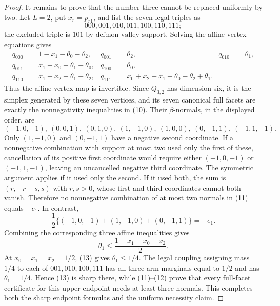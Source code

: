 \documentclass{article}
\begin{document}
\begin{proof}
It remains to prove that the number three cannot be replaced uniformly by two.  Let \(L=2\), put \(x_r=p_{r1}\), and list the seven legal triples as
\[
 000,001,010,011,100,110,111;
\]
the excluded triple is \(101\) by \(\text{def:non-valley-support}\).  Solving the affine vertex equations gives
\[
\begin{aligned}
 q_{000}&=1-x_1-\theta_0-\theta_2,&
 q_{001}&=\theta_2,&
 q_{010}&=\theta_1,\\
 q_{011}&=x_1-x_0-\theta_1+\theta_0,&
 q_{100}&=\theta_0,\\
 q_{110}&=x_1-x_2-\theta_1+\theta_2,&
 q_{111}&=x_0+x_2-x_1-\theta_0-\theta_2+\theta_1.
\end{aligned}                                                                  \tag{10}
\]
Thus the affine vertex map is invertible.  Since \(Q_{3,2}\) has dimension six, it is the simplex generated by these seven vertices, and its seven canonical full facets are exactly the nonnegativity inequalities in (10).  Their \(\beta\)-normals, in the displayed order, are
\[
 (-1,0,-1),\ (0,0,1),\ (0,1,0),\ (1,-1,0),\ (1,0,0),\ (0,-1,1),\ (-1,1,-1). \tag{11}
\]
Only \((1,-1,0)\) and \((0,-1,1)\) have a negative second coordinate.  If a nonnegative combination with support at most two used only the first of these, cancellation of its positive first coordinate would require either \((-1,0,-1)\) or \((-1,1,-1)\), leaving an uncancelled negative third coordinate.  The symmetric argument applies if it used only the second.  If it used both, the sum is \((r,-r-s,s)\) with \(r,s>0\), whose first and third coordinates cannot both vanish.  Therefore no nonnegative combination of at most two normals in (11) equals \(-e_1\).  In contrast,
\[
 \frac12\bigl\{(-1,0,-1)+(1,-1,0)+(0,-1,1)\bigr\}=-e_1.                    \tag{12}
\]
Combining the corresponding three affine inequalities gives
\[
 \theta_1\leq\frac{1+x_1-x_0-x_2}{2}.                                      \tag{13}
\]
At \(x_0=x_1=x_2=1/2\), (13) gives \(\theta_1\leq1/4\).  The legal coupling assigning mass \(1/4\) to each of \(001,010,100,111\) has all three arm marginals equal to \(1/2\) and has \(\theta_1=1/4\).  Hence (13) is sharp there, while (11)--(12) prove that every full-facet certificate for this upper endpoint needs at least three normals.  This completes both the sharp endpoint formulas and the uniform necessity claim.
\end{proof}
\end{document}
